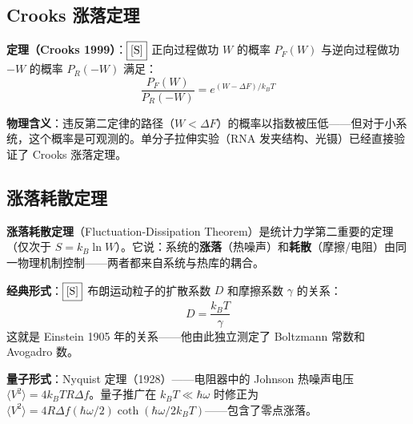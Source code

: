 \subsection{Crooks 涨落定理}

\textbf{定理（Crooks 1999）}：$\fbox{[S]}$ 正向过程做功 $W$ 的概率 $P_F(W)$ 与逆向过程做功 $-W$ 的概率 $P_R(-W)$ 满足：
\begin{equation}
\frac{P_F(W)}{P_R(-W)} = e^{(W - \Delta F)/k_BT}
\end{equation}

\textbf{物理含义}：违反第二定律的路径（$W < \Delta F$）的概率以指数被压低——但对于小系统，这个概率是可观测的。单分子拉伸实验（RNA 发夹结构、光镊）已经直接验证了 Crooks 涨落定理。


\subsection{涨落耗散定理}

\textbf{涨落耗散定理}（Fluctuation-Dissipation Theorem）是统计力学第二重要的定理（仅次于 $S = k_B\ln W$）。它说：系统的\textbf{涨落}（热噪声）和\textbf{耗散}（摩擦/电阻）由同一物理机制控制——两者都来自系统与热库的耦合。

\textbf{经典形式}：$\fbox{[S]}$ 布朗运动粒子的扩散系数 $D$ 和摩擦系数 $\gamma$ 的关系：
\begin{equation}
\boxed{D = \frac{k_B T}{\gamma}}
\end{equation}
这就是 Einstein 1905 年的关系——他由此独立测定了 Boltzmann 常数和 Avogadro 数。

\textbf{量子形式}：Nyquist 定理（1928）——电阻器中的 Johnson 热噪声电压 $\langle V^2 \rangle = 4k_B T R \Delta f$。量子推广在 $k_BT \ll \hbar\omega$ 时修正为 $\langle V^2 \rangle = 4R\Delta f(\hbar\omega/2)\coth(\hbar\omega/2k_BT)$——包含了零点涨落。

\begin{oombox}[涨落在日常生活中的数量级]
\end{oombox}


